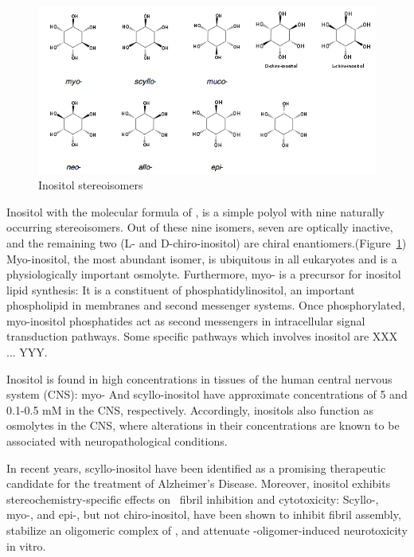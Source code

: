 \begin{figure}
	\centering
	\includegraphics[width=6in]{figures/introduction/inositol.png}
	\caption[Inositol]{Inositol stereoisomers}
	\label{fig:inositols}
\end{figure}


Inositol with the molecular formula of , is a simple polyol with nine naturally occurring stereoisomers. Out of these nine isomers, seven are optically inactive, and the remaining two (L- and D-chiro-inositol) are chiral enantiomers.(Figure~\ref{fig:inositols}) Myo-inositol, the most abundant isomer, is ubiquitous in all eukaryotes and is a physiologically important osmolyte.  Furthermore, myo- is a precursor for inositol lipid synthesis: It is a constituent of phosphatidylinositol, an important phospholipid in membranes and second messenger systems. Once phosphorylated, myo-inositol phosphatides act as second messengers in intracellular signal transduction pathways.\cite{Fisher:2002tk} Some specific pathways which involves inositol are XXX ... YYY.\cite{That nature paper from 2008 on inositides}

Inositol is found in high concentrations in tissues of the human central nervous system (CNS): myo- And scyllo-inositol have approximate concentrations of 5 and 0.1-0.5 mM in the CNS, respectively.\cite{Fisher:2002tk} Accordingly, inositols also function as osmolytes in the CNS, where alterations in their concentrations are known to be associated with neuropathological conditions.\cite{Michaelis:1993gf, Fisher:2002tk}

In recent years, scyllo-inositol have been identified as a promising therapeutic candidate for the treatment of Alzheimer's Disease. Moreover, inositol exhibits stereochemistry-specific effects on \abeta\  fibril inhibition and cytotoxicity: \cite{McLaurin:2000bq} Scyllo-, myo-, and epi-, but not chiro-inositol, have been shown to inhibit  fibril assembly, stabilize an oligomeric complex of , and attenuate \abeta-oligomer-induced neurotoxicity in vitro. 

